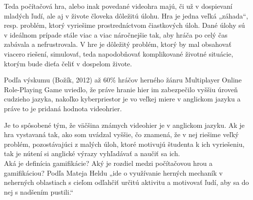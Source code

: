 \documentclass[10pt,slovak,a4paper]{article}
\begin{document}


Teda počítačová hra, alebo inak povedané videohra majú, či už v dospievaní mladých ľudí, ale aj v živote človeka dôležitú úlohu. Hra je jedna veľká „záhada“, resp. problém, ktorý vyriešime prostredníctvom čiastkových úloh. Dané úlohy sú v ideálnom prípade stále viac a viac náročnejšie tak, aby hráča po celý čas zabávala a nefrustrovala. V hre je dôležitý problém, ktorý by mal obsahovať viacero riešení, simulovať, teda napodobňovať komplikované životné situácie, ktorým bude dieťa čeliť v dospelom živote.
\cite{cite2}


\indent Podľa výskumu (Božík, 2012) až 60$\%$ hráčov herného žánru Multiplayer Online Role-Playing Game uviedlo, že práve hranie hier im zabezpečilo vyššiu úroveň cudzieho jazyka, nakoľko kyberpriestor je vo veľkej miere v anglickom jazyku a práve to je pridaná hodnota videohrier. \cite{cite2}


Je to spôsobené tým, že väčšina známych videohier je v anglickom jazyku. Ak je hra vystavaná tak, ako som uvádzal vyššie, čo znamená, že v nej riešime veľký problém, pozostávajúci z malých úloh, ktoré motivujú študenta k ich vyriešeniu, tak je nútení si anglické výrazy vyhľadávať a naučiť sa ich.\\
\indent Aká je definícia gamifikácie? Aký je rozdiel medzi počítačovou hrou a gamifikáciou? Podľa Mateja Heldu „ide o využívanie herných mechaník v neherných oblastiach s cieľom odľahčiť určitú aktivitu a motivovať ľudí, aby sa do nej s nadšením pustili.“
\cite{cite4}
\end{document}
